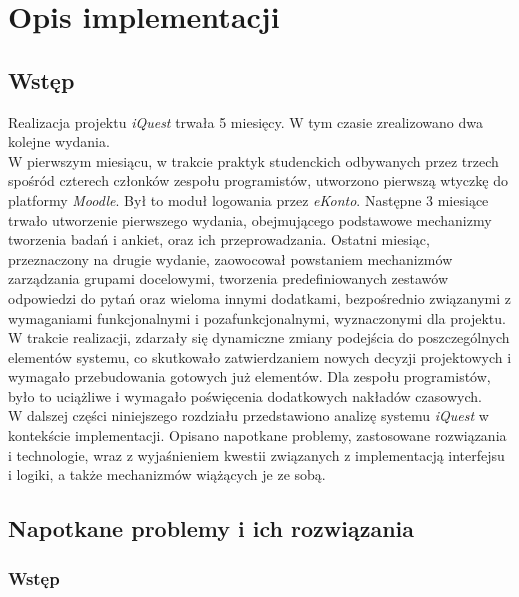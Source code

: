 \chapter{Opis implementacji}
\label{Chapter6}

\section{Wstęp}
\label{Chapter61}

Realizacja projektu \textit{iQuest} trwała 5 miesięcy. W tym czasie zrealizowano dwa kolejne wydania. \\

W pierwszym miesiącu, w trakcie praktyk studenckich odbywanych przez trzech spośród czterech członków zespołu programistów, utworzono pierwszą wtyczkę do platformy \textit{Moodle}. Był to moduł logowania przez \textit{eKonto}. Następne 3 miesiące trwało utworzenie pierwszego wydania, obejmującego podstawowe mechanizmy tworzenia badań i ankiet, oraz ich przeprowadzania. Ostatni miesiąc, przeznaczony na drugie wydanie, zaowocował powstaniem mechanizmów zarządzania grupami docelowymi, tworzenia predefiniowanych zestawów odpowiedzi do pytań oraz wieloma innymi dodatkami, bezpośrednio związanymi z wymaganiami funkcjonalnymi i pozafunkcjonalnymi, wyznaczonymi dla projektu. \\

W trakcie realizacji, zdarzały się dynamiczne zmiany podejścia do poszczególnych elementów systemu, co skutkowało zatwierdzaniem nowych decyzji projektowych i wymagało przebudowania gotowych już elementów. Dla zespołu programistów, było to uciążliwe i wymagało poświęcenia dodatkowych nakładów czasowych. \\

W dalszej części niniejszego rozdziału przedstawiono analizę systemu \textit{iQuest} w kontekście implementacji. Opisano napotkane problemy, zastosowane rozwiązania i technologie, wraz z wyjaśnieniem kwestii związanych z implementacją interfejsu i logiki, a także mechanizmów wiążących je ze sobą.

\section{Napotkane problemy i ich rozwiązania}
\label{Chapter62}

\subsection{Wstęp}
\label{Chapter621}

